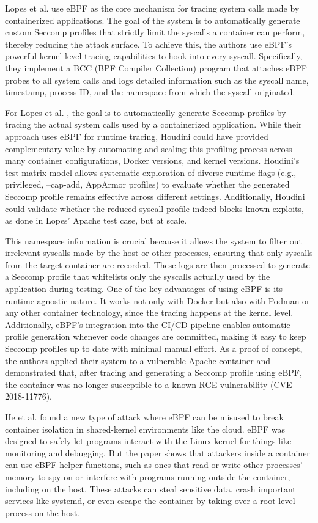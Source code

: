 \begin{doublespace}
Lopes et al. \cite{lopes2020container} use eBPF as the core mechanism for tracing system calls made by containerized applications. The goal of the system is to automatically generate custom Seccomp profiles that strictly limit the syscalls a container can perform, thereby reducing the attack surface. To achieve this, the authors use eBPF's powerful kernel-level tracing capabilities to hook into every syscall. Specifically, they implement a BCC (BPF Compiler Collection) program that attaches eBPF probes to all system calls and logs detailed information such as the syscall name, timestamp, process ID, and the namespace from which the syscall originated.

For Lopes et al. \cite{lopes2020container}, the goal is to automatically generate Seccomp profiles by tracing the actual system calls used by a containerized application. While their approach uses eBPF for runtime tracing, Houdini could have provided complementary value by automating and scaling this profiling process across many container configurations, Docker versions, and kernel versions. Houdini’s test matrix model allows systematic exploration of diverse runtime flags (e.g., --privileged, --cap-add, AppArmor profiles) to evaluate whether the generated Seccomp profile remains effective across different settings. Additionally, Houdini could validate whether the reduced syscall profile indeed blocks known exploits, as done in Lopes' Apache test case, but at scale.

This namespace information is crucial because it allows the system to filter out irrelevant syscalls made by the host or other processes, ensuring that only syscalls from the target container are recorded. These logs are then processed to generate a Seccomp profile that whitelists only the syscalls actually used by the application during testing. One of the key advantages of using eBPF is its runtime-agnostic nature. It works not only with Docker but also with Podman or any other container technology, since the tracing happens at the kernel level. Additionally, eBPF's integration into the CI/CD pipeline enables automatic profile generation whenever code changes are committed, making it easy to keep Seccomp profiles up to date with minimal manual effort. As a proof of concept, the authors applied their system to a vulnerable Apache container and demonstrated that, after tracing and generating a Seccomp profile using eBPF, the container was no longer susceptible to a known RCE vulnerability (CVE-2018-11776).

He et al. \cite{he2023cross} found a new type of attack where eBPF can be misused to break container isolation in shared-kernel environments like the cloud. eBPF was designed to safely let programs interact with the Linux kernel for things like monitoring and debugging. But the paper shows that attackers inside a container can use eBPF helper functions, such as ones that read or write other processes’ memory to spy on or interfere with programs running outside the container, including on the host. These attacks can steal sensitive data, crash important services like systemd, or even escape the container by taking over a root-level process on the host.


\end{doublespace}
